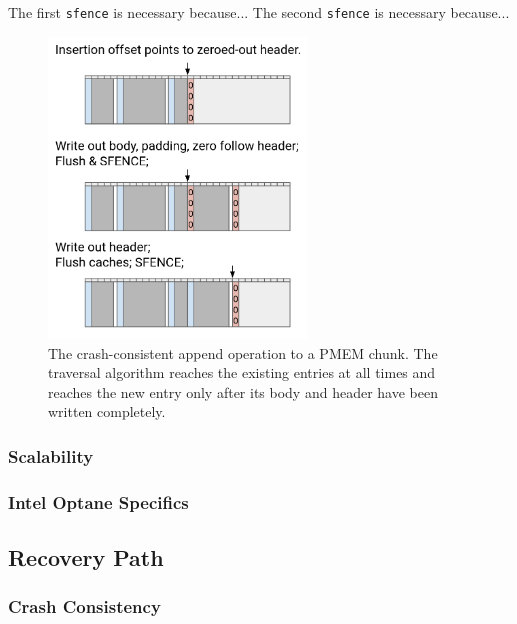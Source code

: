 \documentclass[12pt,a4paper,twoside]{book}
\begin{document}
The first \lstinline{sfence} is necessary because...
The second \lstinline{sfence} is necessary because...

\begin{figure}[H]
    \centering
    \includegraphics[height=8cm]{fig/prb_writepath_crashconsistent_append}
    \caption{
        The crash-consistent append operation to a PMEM chunk.
        The traversal algorithm reaches the existing entries at all times and reaches the new entry only after its body and header have been written completely.
    }
    \label{fig:prb_writepath_crashconsistent_append}
\end{figure}

\subsubsection{Scalability}\label{di:prb:write:scalability}

\subsubsection{Intel Optane Specifics}\label{di:prb:write:optanespecifics}

\subsection{Recovery Path}\label{di:prb:recovery}

\subsubsection{Crash Consistency}
\end{document}
